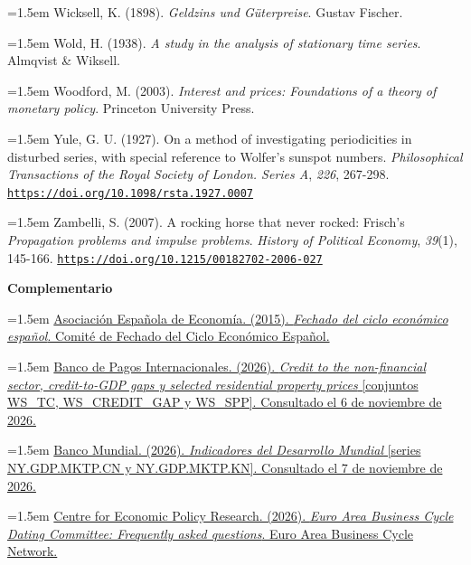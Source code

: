 \documentclass[10pt,a4paper]{article}
\begin{document}
\noindent\hangindent=1.5em Wicksell, K. (1898). \textit{Geldzins und Güterpreise}. Gustav Fischer.

\noindent\hangindent=1.5em Wold, H. (1938). \textit{A study in the analysis of stationary time series}. Almqvist \& Wiksell.

\noindent\hangindent=1.5em Woodford, M. (2003). \textit{Interest and prices: Foundations of a theory of monetary policy}. Princeton University Press.

{\sloppy\noindent\hangindent=1.5em Yule, G. U. (1927). On a method of investigating periodicities in disturbed series, with special reference to Wolfer's sunspot numbers. \textit{Philosophical Transactions of the Royal Society of London. Series A}, \textit{226}, 267-298. \href{https://doi.org/10.1098/rsta.1927.0007}{\nolinkurl{https://doi.org/10.1098/rsta.1927.0007}}\par}

\noindent\hangindent=1.5em Zambelli, S. (2007). A rocking horse that never rocked: Frisch's \textit{Propagation problems and impulse problems}. \textit{History of Political Economy}, \textit{39}(1), 145-166. \href{https://doi.org/10.1215/00182702-2006-027}{\nolinkurl{https://doi.org/10.1215/00182702-2006-027}}

\textbf{Complementario}

\noindent\hangindent=1.5em \href{http://www.asesec.org/CFCweb/index.php/archivo-historico-del-ciclo-economico-espanol/}{Asociación Española de Economía. (2015). \textit{Fechado del ciclo económico español}. Comité de Fechado del Ciclo Económico Español.}

\noindent\hangindent=1.5em \href{https://data.bis.org/}{Banco de Pagos Internacionales. (2026). \textit{Credit to the non-financial sector, credit-to-GDP gaps y selected residential property prices} [conjuntos WS\_TC, WS\_CREDIT\_GAP y WS\_SPP]. Consultado el 6 de noviembre de 2026.}

\noindent\hangindent=1.5em \href{https://databank.worldbank.org/source/world-development-indicators}{Banco Mundial. (2026). \textit{Indicadores del Desarrollo Mundial} [series NY.GDP.MKTP.CN y NY.GDP.MKTP.KN]. Consultado el 7 de noviembre de 2026.}

\noindent\hangindent=1.5em \href{https://eabcn.org/dc/faq}{Centre for Economic Policy Research. (2026). \textit{Euro Area Business Cycle Dating Committee: Frequently asked questions}. Euro Area Business Cycle Network.}
\end{document}
